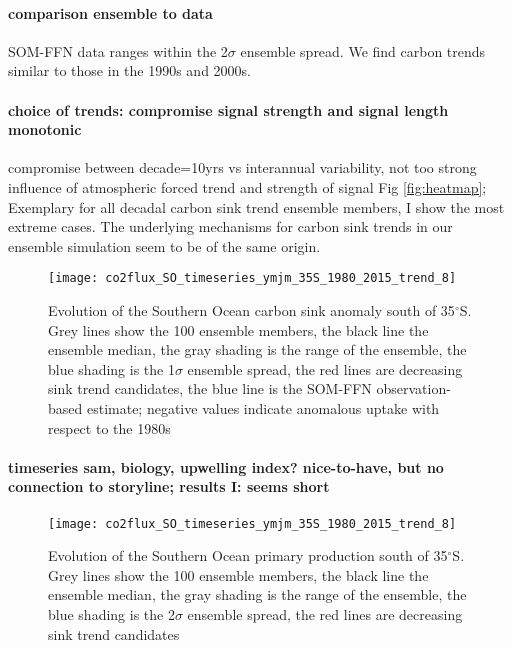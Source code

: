 \documentclass[12pt]{article}
\begin{document}
\paragraph{comparison ensemble to data} SOM-FFN data ranges within the 2$\sigma$ ensemble spread. We find carbon trends similar to those in the 1990s and 2000s. 


\paragraph{choice of trends: compromise signal strength and signal length monotonic} compromise between decade=10yrs vs interannual variability, not too strong influence of atmospheric forced trend and strength of signal Fig \ref{fig:heatmap}; Exemplary for all decadal carbon sink trend ensemble members, I show the most extreme cases. The underlying mechanisms for carbon sink trends in our ensemble simulation seem to be of the same origin.


\begin{figure}[h!]
\texttt{[image: co2flux\_SO\_timeseries\_ymjm\_35S\_1980\_2015\_trend\_8]}
\caption{Evolution of the Southern Ocean carbon sink anomaly south of 35$^\circ$S. Grey lines show the 100 ensemble members, the black line the ensemble median, the gray shading is the range of the ensemble, the blue shading is the 1$\sigma$ ensemble spread, the red lines are decreasing sink trend candidates, the blue line is the SOM-FFN observation-based estimate; negative values indicate anomalous uptake with respect to the 1980s}
\label{fig:evolution_southern_ocean_carbon_sink}
\end{figure}


\paragraph{timeseries sam, biology, upwelling index? nice-to-have, but no connection to storyline; results I: seems short}


\begin{figure}[h!]
\texttt{[image: co2flux\_SO\_timeseries\_ymjm\_35S\_1980\_2015\_trend\_8]}
\caption{Evolution of the Southern Ocean primary production south of 35$^\circ$S. Grey lines show the 100 ensemble members, the black line the ensemble median, the gray shading is the range of the ensemble, the blue shading is the 2$\sigma$ ensemble spread, the red lines are decreasing sink trend candidates}
\label{fig:evolution_southern_ocean_intpp}
\end{figure}
\end{document}
